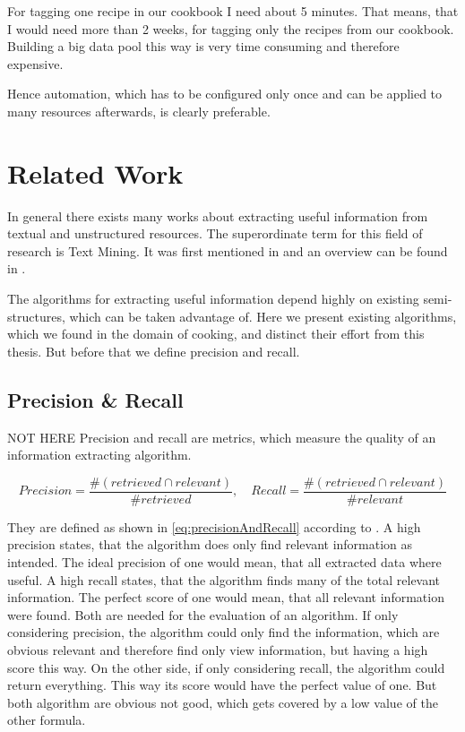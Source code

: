\documentclass[12pt, twoside]{report}
\begin{document}
For tagging one recipe in our cookbook I need about 5 minutes. That means, that I would need more than 2 weeks, for tagging only the recipes from our cookbook. Building a big data pool this way is very time consuming and therefore expensive.

Hence automation, which has to be configured only once and can be applied to many resources afterwards, is clearly preferable.



\chapter{Related Work}
In general there exists many works about extracting useful information from textual and unstructured resources. The superordinate term for this field of research is Text Mining. It was first mentioned in \parencite{KDT} and an overview can be found in \parencite{surveyOfTextMining}. 

The algorithms for extracting useful information depend highly on existing semi-structures, which can be taken advantage of. Here we present existing algorithms, which we found in the domain of cooking, and distinct their effort from this thesis. But before that we define precision and recall.

\section{Precision \& Recall}
NOT HERE
Precision and recall are metrics, which measure the quality of an information extracting algorithm.

\begin{equation} \label{eq:precisionAndRecall}
	Precision = \frac{\#(retrieved \cap relevant)}{\#retrieved}, \hspace{1em} Recall = \frac{\#(retrieved \cap relevant)}{\#relevant}
\end{equation}

They are defined as shown in \cref{eq:precisionAndRecall} according to  \parencite{surveyOfTextMining}. A high precision states, that the algorithm does only find relevant information as intended. The ideal precision of one would mean, that all extracted data where useful. A high recall states, that the algorithm finds many of the total relevant information. The perfect score of one would mean, that all relevant information were found. Both are needed for the evaluation of an algorithm. If only considering precision, the algorithm could only find the information, which are obvious relevant and therefore find only view information, but having a high score this way. On the other side, if only considering recall, the algorithm could return everything. This way its score would have the perfect value of one. But both algorithm are obvious not good, which gets covered by a low value of the other formula.
\end{document}
